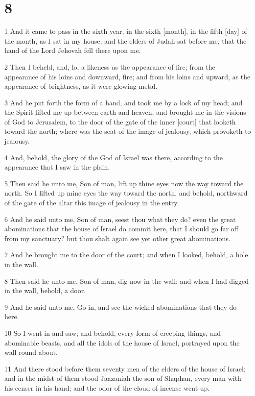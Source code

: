 \chapter{8}

\par 1 And it came to pass in the sixth year, in the sixth [month], in the fifth [day] of the month, as I sat in my house, and the elders of Judah sat before me, that the hand of the Lord Jehovah fell there upon me.
\par 2 Then I beheld, and, lo, a likeness as the appearance of fire; from the appearance of his loins and downward, fire; and from his loins and upward, as the appearance of brightness, as it were glowing metal.
\par 3 And he put forth the form of a hand, and took me by a lock of my head; and the Spirit lifted me up between earth and heaven, and brought me in the visions of God to Jerusalem, to the door of the gate of the inner [court] that looketh toward the north; where was the seat of the image of jealousy, which provoketh to jealousy.
\par 4 And, behold, the glory of the God of Israel was there, according to the appearance that I saw in the plain.
\par 5 Then said he unto me, Son of man, lift up thine eyes now the way toward the north. So I lifted up mine eyes the way toward the north, and behold, northward of the gate of the altar this image of jealousy in the entry.
\par 6 And he said unto me, Son of man, seest thou what they do? even the great abominations that the house of Israel do commit here, that I should go far off from my sanctuary? but thou shalt again see yet other great abominations.
\par 7 And he brought me to the door of the court; and when I looked, behold, a hole in the wall.
\par 8 Then said he unto me, Son of man, dig now in the wall: and when I had digged in the wall, behold, a door.
\par 9 And he said unto me, Go in, and see the wicked abominations that they do here.
\par 10 So I went in and saw; and behold, every form of creeping things, and abominable beasts, and all the idols of the house of Israel, portrayed upon the wall round about.
\par 11 And there stood before them seventy men of the elders of the house of Israel; and in the midst of them stood Jaazaniah the son of Shaphan, every man with his censer in his hand; and the odor of the cloud of incense went up.
